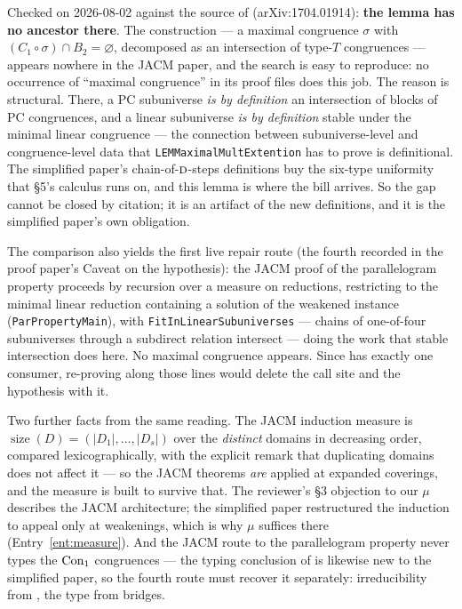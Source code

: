 \begin{entry}\label{ent:d17-jacm}
Checked on 2026-08-02 against the source of \cite{ZhukJACM}
(arXiv:1704.01914): \textbf{the lemma has no ancestor there}. The construction ---
a maximal congruence $\sigma$ with $(C_{1}\circ\sigma)\cap B_{2}=\varnothing$,
decomposed as an intersection of type-$T$ congruences --- appears nowhere in
the JACM paper, and the search is easy to reproduce: no occurrence of
``maximal congruence'' in its proof files does this job. The reason is
structural. There, a PC subuniverse \emph{is by definition} an intersection of
blocks of PC congruences, and a linear subuniverse \emph{is by definition}
stable under the minimal linear congruence --- the connection between
subuniverse-level and congruence-level data that
\texttt{LEMMaximalMultExtention} has to prove is definitional. The simplified
paper's chain-of-$\textup{\textsc{d}}$-steps definitions buy the six-type uniformity that
\S5's calculus runs on, and this lemma is where the bill arrives. So the gap
cannot be closed by citation; it is an artifact of the new definitions, and it
is the simplified paper's own obligation.

The comparison also yields the first live repair route (the fourth recorded
in the proof paper's Caveat on the hypothesis): the JACM proof of the
parallelogram property proceeds by recursion over a measure on reductions,
restricting to the minimal linear reduction containing a solution of the
weakened instance (\texttt{ParPropertyMain}), with
\texttt{FitInLinearSubuniverses} --- chains of one-of-four subuniverses
through a subdirect relation intersect --- doing the work that stable
intersection does here. No maximal congruence appears. Since
 has exactly one consumer, re-proving
 along those lines would delete the call site
and the hypothesis with it.

Two further facts from the same reading. The JACM induction measure is
$\operatorname{size}(D)=(|D_{1}|,\dots,|D_{s}|)$ over the \emph{distinct}
domains in decreasing order, compared lexicographically, with the explicit
remark that
duplicating domains does not affect it --- so the JACM theorems \emph{are}
applied at expanded coverings, and the measure is built to survive that. The
reviewer's \S3 objection to our $\mu$ describes the JACM architecture; the
simplified paper restructured the induction to appeal only at weakenings,
which is why $\mu$ suffices there (Entry~\ref{ent:measure}). And the JACM
route to the parallelogram property never types the $\operatorname{Con}_1$ congruences ---
the typing conclusion of  is likewise new to
the simplified paper, so the fourth route must recover it separately:
irreducibility from , the type from bridges.
\end{entry}

